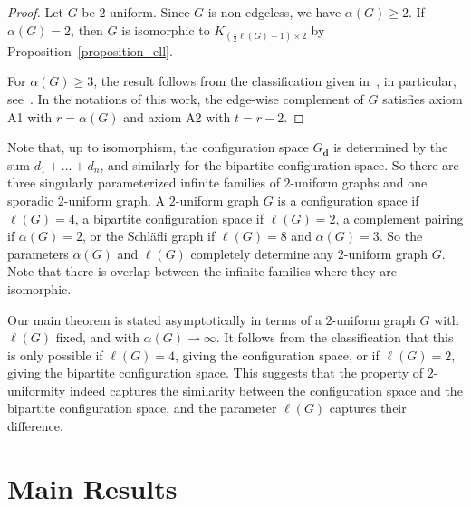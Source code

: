 \documentclass{article}
\theoremstyle{plain}
\theoremstyle{remark}
\theoremstyle{plain}
\numberwithin{equation}{section}
\renewcommand{\d}{{\boldsymbol{d}}}
\begin{document}
	\begin{proof}
		Let $G$ be $2$-uniform. Since $G$ is non-edgeless, we have $\alpha(G)\geq2$. If $\alpha(G)=2$, then $G$ is isomorphic to $K_{(\frac12\ell(G)+1)\times2}$ by Proposition~\ref{proposition_ell}.
		
		For $\alpha(G)\geq3$, the result follows from the classification given in~\cite[Section~7, Part~A]{ZARA}, in particular, see~\cite[Remark~7.7]{ZARA}. In the notations of this work, the edge-wise complement of $G$ satisfies axiom A1 with $r=\alpha(G)$ and axiom A2 with $t=r-2$.
	\end{proof}
	
	Note that, up to isomorphism, the configuration space $G_{\d}$ is determined by the sum $d_1+\ldots+d_n$, and similarly for the bipartite configuration space. So there are three singularly parameterized infinite families of $2$-uniform graphs and one sporadic $2$-uniform graph. A $2$-uniform graph $G$ is a configuration space if $\ell(G)=4$, a bipartite configuration space if $\ell(G)=2$, a complement pairing if $\alpha(G)=2$, or the Schl\"afli graph if $\ell(G)=8$ and $\alpha(G)=3$. So the parameters $\alpha(G)$ and $\ell(G)$ completely determine any $2$-uniform graph $G$. Note that there is overlap between the infinite families where they are isomorphic.
	
	Our main theorem is stated asymptotically in terms of a $2$-uniform graph $G$ with $\ell(G)$ fixed, and with $\alpha(G)\to\infty$. It follows from the classification that this is only possible if $\ell(G)=4$, giving the configuration space, or if $\ell(G)=2$, giving the bipartite configuration space. This suggests that the property of $2$-uniformity indeed captures the similarity between the configuration space and the bipartite configuration space, and the parameter $\ell(G)$ captures their difference.
	
	
	\section{Main Results}\label{section_main}
	
\end{document}
